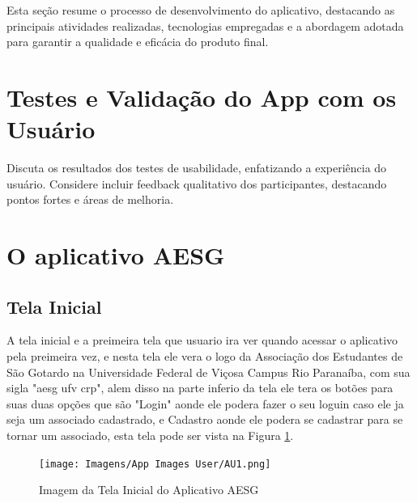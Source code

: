 \documentclass[
    12pt,                   %
    openright,              %
    oneside,                %
    a4paper,                %
    sumario=tradicional,    %
    english,                %
    brazil,                 %
    ]{abntex2}
\begin{document}
        Esta seção resume o processo de desenvolvimento do aplicativo, destacando as principais atividades realizadas, tecnologias empregadas e a abordagem adotada para garantir a qualidade e eficácia do produto final.
    
    \section{Testes e Validação do App com os Usuário}
    
    Discuta os resultados dos testes de usabilidade, enfatizando a experiência do usuário. Considere incluir feedback qualitativo dos participantes, destacando pontos fortes e áreas de melhoria.
    
    \section{O aplicativo AESG}
        \subsection{Tela Inicial}
            A tela inicial e a preimeira tela que usuario ira ver quando acessar o aplicativo pela preimeira vez, e nesta tela ele vera o logo da Associação dos Estudantes de São Gotardo na Universidade Federal de Viçosa Campus Rio Paranaíba, com sua sigla "aesg ufv crp", alem disso na parte inferio da tela ele tera os botões para suas duas opções que são "Login" aonde ele podera fazer o seu loguin caso ele ja seja um associado cadastrado, e Cadastro aonde ele podera se cadastrar para se tornar um associado, esta tela pode ser vista na Figura \ref{fig:AppTelaInicial}.

            \begin{figure}[!h]
                \begin{center}
                \centering
                \texttt{[image: Imagens/App Images          User/AU1.png]}
                \end{center}
                \caption[Imagem da Tela Inicial do Aplicativo AESG]{ 
                Imagem da Tela Inicial do Aplicativo AESG}
                \label{fig:AppTelaInicial}
            \end{figure}
            
\end{document}
